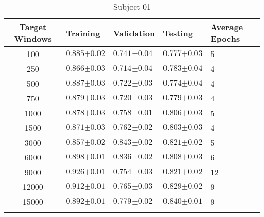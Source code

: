\begin{table}[H]
    \centering
    \caption[Classification accuracy for a 32 unit  model with the dense layer retrained with increasing amount of target data]{Classification accuracy for a 32 unit \acrshort{lstm} model with the dense layer retrained  with increasing amount of target data. The table shows the classification accuracy for the target user training, validation and test data sets $\pm\sigma (n=25)$. A value of one represents 100\% correct classification.}
    \label{tab:classifcation_performance_frozen-lstm-layer}
    \begin{subtable}{\textwidth}
    \caption{Subject 01}
    \begin{tabularx}{\textwidth}{cYYYY}
        Target Windows & Training & Validation & Testing & Average Epochs \\
         & $0.885{\scriptscriptstyle\pm0.02}$ & $0.741{\scriptscriptstyle\pm0.04}$ & $0.777{\scriptscriptstyle\pm0.03}$ & 5 \\
250 & $0.866{\scriptscriptstyle\pm0.03}$ & $0.714{\scriptscriptstyle\pm0.04}$ & $0.783{\scriptscriptstyle\pm0.04}$ & 4 \\
500 & $0.887{\scriptscriptstyle\pm0.03}$ & $0.722{\scriptscriptstyle\pm0.03}$ & $0.774{\scriptscriptstyle\pm0.04}$ & 4 \\
750 & $0.879{\scriptscriptstyle\pm0.03}$ & $0.720{\scriptscriptstyle\pm0.03}$ & $0.779{\scriptscriptstyle\pm0.03}$ & 4 \\
1000 & $0.878{\scriptscriptstyle\pm0.03}$ & $0.758{\scriptscriptstyle\pm0.01}$ & $0.806{\scriptscriptstyle\pm0.03}$ & 5 \\
1500 & $0.871{\scriptscriptstyle\pm0.03}$ & $0.762{\scriptscriptstyle\pm0.02}$ & $0.803{\scriptscriptstyle\pm0.03}$ & 4 \\
3000 & $0.857{\scriptscriptstyle\pm0.02}$ & $0.843{\scriptscriptstyle\pm0.02}$ & $0.821{\scriptscriptstyle\pm0.02}$ & 5 \\
6000 & $0.898{\scriptscriptstyle\pm0.01}$ & $0.836{\scriptscriptstyle\pm0.02}$ & $0.808{\scriptscriptstyle\pm0.03}$ & 6 \\
9000 & $0.926{\scriptscriptstyle\pm0.01}$ & $0.754{\scriptscriptstyle\pm0.03}$ & $0.821{\scriptscriptstyle\pm0.02}$ & 12 \\
12000 & $0.912{\scriptscriptstyle\pm0.01}$ & $0.765{\scriptscriptstyle\pm0.03}$ & $0.829{\scriptscriptstyle\pm0.02}$ & 9 \\
15000 & $0.892{\scriptscriptstyle\pm0.01}$ & $0.779{\scriptscriptstyle\pm0.02}$ & $0.840{\scriptscriptstyle\pm0.01}$ & 9 \\
          \\
    \end{tabularx}
    \end{subtable}
\end{table}
